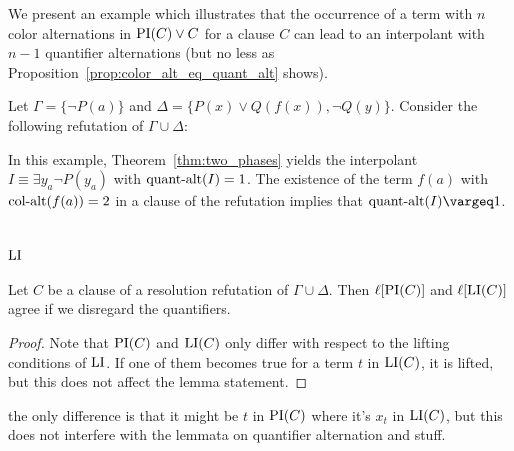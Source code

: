 \documentclass[,%
	draft=false,%
	numbers=noendperiod
	12pt,
	a4paper,
	oneside,%
	openany,
]{memoir}
\begin{document}
We present an example which illustrates that the occurrence of a term with $n$ color alternations in $\PI(C) \lor C$ for a clause $C$ can lead to an interpolant with $n-1$ quantifier alternations (but no less as Proposition~\ref{prop:color_alt_eq_quant_alt} shows).
\begin{exa}
	Let $\Gamma = \{ \lnot P(a) \}$ and $\Delta = \{ P(x) \lor Q(f(x)), \lnot Q(y) \}$.
	Consider the following refutation of $\Gamma \cup \Delta$:
	\begin{prooftree}


	\end{prooftree}

	In this example, Theorem~\ref{thm:two_phases} yields the interpolant $I \equiv \exists y_a \lnot P(y_a)$ with $\qa(I) =\nolinebreak 1$.
	The existence of the term $f(a)$ with $\ca(f(a)) = 2$ in a clause of the refutation implies that $\qa(I) \vargeq 1$.
\end{exa}



\section{$\LI$}

\begin{clemma}
	Let $C$ be a clause of a resolution refutation of $\Gamma \cup \Delta$.
	Then $\lifboth{\PI(C)}$ and $\lifboth{\LI(C)}$ agree if we disregard the quantifiers.
\end{clemma}
\begin{proof}
	Note that $\PI(C)$ and $\LI(C)$ only differ with respect to the lifting conditions of $\LI$.
	If one of them becomes true for a term $t$ in $\LI(C)$, it is lifted, but this does not affect the lemma statement.
\end{proof}


the only difference is that it might be $t$ in $\PI(C)$ where it's $x_t$ in $\LI(C)$, but this does not interfere with the lemmata on quantifier alternation and stuff. 
\end{document}
